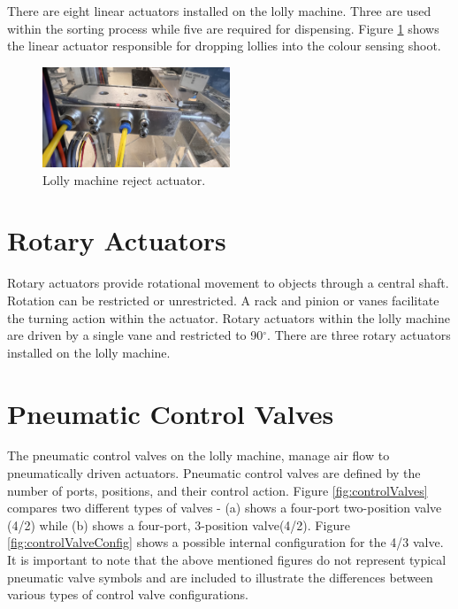     
    There are eight linear actuators installed on the lolly machine. Three are used within the sorting process while five are required for dispensing. Figure \ref{fig:rejectAct} shows the linear actuator responsible for dropping lollies into the colour sensing shoot.

    \begin{figure}[H] 
        \centering
        \includegraphics[width = 0.5\textwidth]{2_images/rejectAct.png}
        \caption{Lolly machine reject actuator.}
        \label{fig:rejectAct}
    \end{figure}        
    
\section{Rotary Actuators}
    Rotary actuators provide rotational movement to objects through a central shaft\cite{parr2011hydraulics}. Rotation can be restricted or unrestricted. A rack and pinion or vanes facilitate the turning action within the actuator\cite{parr2011hydraulics}. Rotary actuators within the lolly machine are driven by a single vane and restricted to 90$^{\circ}$\cite{smcRot}. There are three rotary actuators installed on the lolly machine.

\section{Pneumatic Control Valves}
    The pneumatic control valves on the lolly machine, manage air flow to pneumatically driven actuators. Pneumatic control valves are defined by the number of ports, positions, and their control action\cite{parr2011hydraulics}. Figure \ref{fig:controlValves} compares two different types of valves - (a) shows a four-port two-position valve (4/2) while (b) shows a four-port, 3-position valve(4/2). Figure \ref{fig:controlValveConfig} shows a possible internal configuration for the 4/3 valve. It is important to note that the above mentioned figures do not represent typical pneumatic valve symbols and are included to illustrate the differences between various types of control valve configurations.
    
